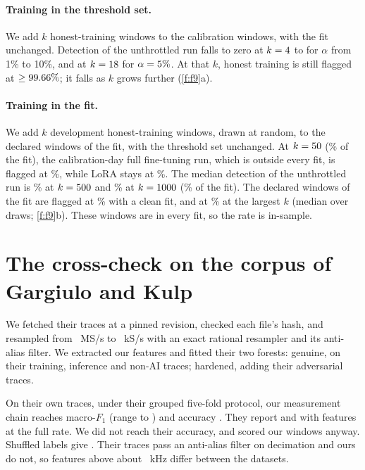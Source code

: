 \paragraph{Training in the threshold set.} We add $k$ honest-training windows to the
\EthreeCalWindows{} calibration windows, with the fit unchanged. Detection of the
unthrottled run falls to zero at $k = 4$ to \EthreeKTen{} for $\alpha$
from 1\% to 10\%, and at $k = 18$ for $\alpha = 5\%$. At that $k$, honest
training is still flagged at $\ge 99.66\%$; it falls as $k$ grows further
(\cref{f:f9}a).

\paragraph{Training in the fit.} We add $k$ development honest-training windows, drawn at
random, to the \EfourNDeclared{} declared windows of the fit, with the threshold set
unchanged. At $k = 50$ (\EfourShareHonest\% of the fit), the calibration-day
full fine-tuning run, which is outside every fit, is flagged at \EfourFullCal\%, while
LoRA stays at \EfourLoraCal\%. The median detection of the unthrottled run is
\EfourHalfDet\% at $k = 500$ and \EfourGoneDet\% at $k = 1000$
(\EfourShareGone\% of the fit). The declared windows of the fit are flagged at
\EfourDeclZero\% with a clean fit, and at \EfourDeclEnd\% at the largest $k$ (median over
draws; \cref{f:f9}b). These windows are in every fit, so the rate is in-sample.

\section{The cross-check on the corpus of Gargiulo and Kulp}\label{a:gk}

We fetched their \GkNTraces{} traces \citep{gkdataset} at a pinned revision, checked each file's hash,
and resampled from \GkRate{}~MS/s to \GkDecimated{}~kS/s with an exact rational
resampler and its anti-alias filter. We extracted our \NFeat{} features and fitted
their two forests: genuine, on their training, inference and non-AI traces; hardened,
adding their adversarial traces.

On their own traces, under their grouped five-fold protocol, our measurement chain reaches
macro-$F_1$ \GkOwnFone{} (range \GkOwnFoneLo{} to \GkOwnFoneHi) and accuracy
\GkOwnAcc. They report \GkFone{} and \GkAcc{} with \GkNFeat{} features at the full
rate. We did not reach their accuracy, and scored our windows anyway. Shuffled labels give \GkShuffle. Their traces pass an anti-alias
filter on decimation and ours do not, so features above about \GkAliasKhz{}~kHz differ
between the datasets.

